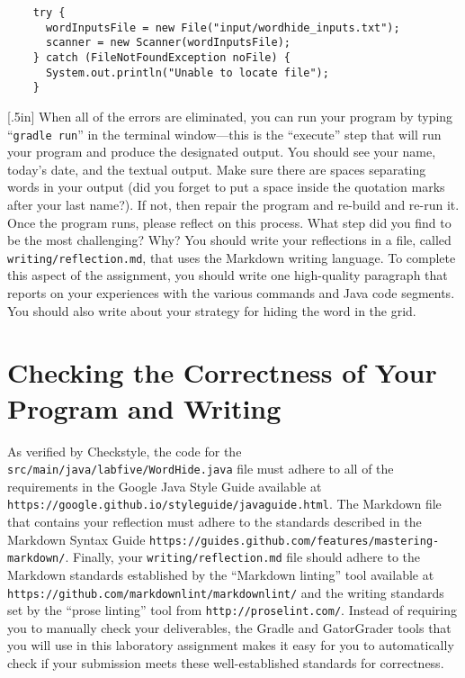 \documentclass[11pt]{article}
\newcommand{\mainprogramsource}{\lstinline{src/main/java/labfive/WordHide.java}}
\newcommand{\reflection}{\lstinline{writing/reflection.md}}
\newcommand{\gradlerun}{\command{gradle run}}
\newcommand{\command}[1]{``\lstinline{#1}''}
\newcommand{\url}[1]{\lstinline{#1}}
\newcommand{\step}[1]{``{#1}''}
\newcommand{\think}[1]{\null\hfill\LARGE{\faCogs{}}\newline\scriptsize{\em{#1}}}
\begin{document}
\vspace*{-.1in}
\begin{verbatim}
    try {
      wordInputsFile = new File("input/wordhide_inputs.txt");
      scanner = new Scanner(wordInputsFile);
    } catch (FileNotFoundException noFile) {
      System.out.println("Unable to locate file");
    }
\end{verbatim}
\vspace*{-.1in}

\marginnote{\think{Reflect on challenges}}[.5in] When all of the errors are
eliminated, you can run your program by typing \gradlerun{} in the terminal
window---this is the ``execute'' step that will run your program and produce the
designated output. You should see your name, today's date, and the textual
output. Make sure there are spaces separating words in your output (did you
forget to put a space inside the quotation marks after your last name?). If not,
then repair the program and re-build and re-run it. Once the program runs,
please reflect on this process. What step did you find to be the most
challenging? Why? You should write your reflections in a file, called
\reflection{}, that uses the Markdown writing language. To complete this aspect
of the assignment, you should write one high-quality paragraph that reports on
your experiences with the various commands and Java code segments. You should
also write about your strategy for hiding the word in the grid.

\section*{Checking the Correctness of Your Program and Writing}

As verified by Checkstyle, the code for the \mainprogramsource{} file must
adhere to all of the requirements in the Google Java Style Guide available at
\url{https://google.github.io/styleguide/javaguide.html}. The Markdown file that
contains your reflection must adhere to the standards described in the Markdown
Syntax Guide \url{https://guides.github.com/features/mastering-markdown/}.
Finally, your \reflection{} file should adhere to the Markdown standards
established by the \step{Markdown linting} tool available at
\url{https://github.com/markdownlint/markdownlint/} and the writing standards
set by the \step{prose linting} tool from \url{http://proselint.com/}. Instead
of requiring you to manually check your deliverables, the Gradle and GatorGrader
tools that you will use in this laboratory assignment makes it easy for you to
automatically check if your submission meets these well-established standards
for correctness.
\end{document}
